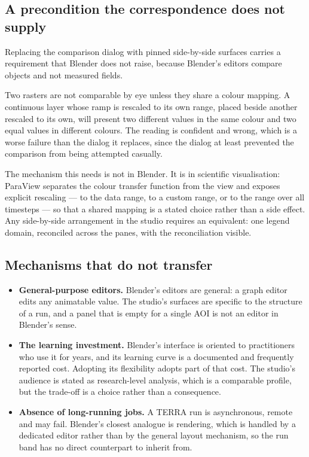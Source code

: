 \documentclass[11pt,a4paper]{article}
\begin{document}
\subsection{A precondition the correspondence does not supply}
\label{sec:precondition}

Replacing the comparison dialog with pinned side-by-side surfaces carries a
requirement that Blender does not raise, because Blender's editors compare
objects and not measured fields.

Two rasters are not comparable by eye unless they share a colour mapping. A
continuous layer whose ramp is rescaled to its own range, placed beside another
rescaled to its own, will present two different values in the same colour and
two equal values in different colours. The reading is confident and wrong, which
is a worse failure than the dialog it replaces, since the dialog at least
prevented the comparison from being attempted casually.

The mechanism this needs is not in Blender. It is in scientific visualisation:
ParaView separates the colour transfer function from the view and exposes
explicit rescaling --- to the data range, to a custom range, or to the range
over all timesteps --- so that a shared mapping is a stated choice rather than a
side effect. Any side-by-side arrangement in the studio requires an equivalent:
one legend domain, reconciled across the panes, with the reconciliation visible.

\subsection{Mechanisms that do not transfer}

\begin{itemize}
\item \textbf{General-purpose editors.} Blender's editors are general: a graph
      editor edits any animatable value. The studio's surfaces are specific to
      the structure of a run, and a panel that is empty for a single AOI is not
      an editor in Blender's sense.
\item \textbf{The learning investment.} Blender's interface is oriented to
      practitioners who use it for years, and its learning curve is a documented
      and frequently reported cost. Adopting its flexibility adopts part of that
      cost. The studio's audience is stated as research-level analysis, which is
      a comparable profile, but the trade-off is a choice rather than a
      consequence.
\item \textbf{Absence of long-running jobs.} A TERRA run is asynchronous,
      remote and may fail. Blender's closest analogue is rendering, which is
      handled by a dedicated editor rather than by the general layout mechanism,
      so the run band has no direct counterpart to inherit from.
\end{itemize}
\end{document}
